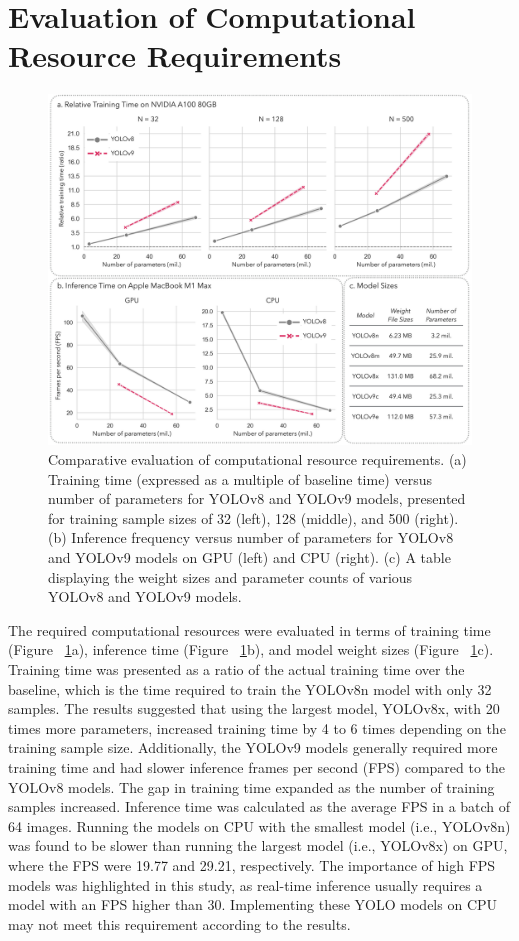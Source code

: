\section*{Evaluation of Computational Resource Requirements}
\begin{figure}[h]
\centering
\includegraphics[width=1\textwidth]{figure_6.jpg}
\caption{Comparative evaluation of computational resource requirements. (a) Training time (expressed as a multiple of baseline time) versus number of parameters for YOLOv8 and YOLOv9 models, presented for training sample sizes of 32 (left), 128 (middle), and 500 (right). (b) Inference frequency versus number of parameters for YOLOv8 and YOLOv9 models on GPU (left) and CPU (right). (c) A table displaying the weight sizes and parameter counts of various YOLOv8 and YOLOv9 models.}

\label{fig:resources}
\end{figure}
The required computational resources were evaluated in terms of training time (Figure ~\ref{fig:resources}a), inference time (Figure ~\ref{fig:resources}b), and model weight sizes (Figure ~\ref{fig:resources}c). Training time was presented as a ratio of the actual training time over the baseline, which is the time required to train the YOLOv8n model with only 32 samples. The results suggested that using the largest model, YOLOv8x, with 20 times more parameters, increased training time by 4 to 6 times depending on the training sample size. Additionally, the YOLOv9 models generally required more training time and had slower inference frames per second (FPS) compared to the YOLOv8 models. The gap in training time expanded as the number of training samples increased. Inference time was calculated as the average FPS in a batch of 64 images. Running the models on CPU with the smallest model (i.e., YOLOv8n) was found to be slower than running the largest model (i.e., YOLOv8x) on GPU, where the FPS were 19.77 and 29.21, respectively. The importance of high FPS models was highlighted in this study, as real-time inference usually requires a model with an FPS higher than 30. Implementing these YOLO models on CPU may not meet this requirement according to the results.

